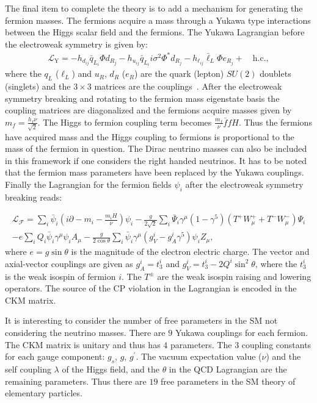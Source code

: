 The final item to complete the theory is to add a mechanism for generating the fermion masses. The fermions acquire a mass through a Yukawa type interactions between the Higgs scalar field and the fermions. The Yukawa Lagrangian before the electroweak symmetry is given by:
\begin{eqnarray} \label{eq:yukawa}
\mathcal{L_{\mathrm{Y}}} = -h_{d_{ij}} \bar{q}_{L_{i}} \Phi d_{R_j}  - h_{u_{ij}} \bar{q}_{L_{i}} i\sigma^{2}\Phi^{*}d_{R_j} - h_{\ell_{ij}} \bar{\ell}_L \Phi e_{R_j} + \quad \mathrm{h.c.}, 
\end{eqnarray}   
where the $q_L$ ($\ell_L$) and $u_R$, $d_R$ ($e_R$) are the quark (lepton) $SU(2)$ doublets (singlets) and the $3\times3$ matrices are the couplings~\cite{Agashe:2014kda}. After the electroweak symmetry breaking and rotating to the fermion mass eigenstate basis the coupling matrices are diagonalized and the fermions acquire masses given by $m_{f} = \frac{h_f \nu}{\sqrt{2}}$. The Higgs to fermion coupling term becomes $\frac{m_{f}}{\nu}\bar{f}fH$. Thus the fermions have acquired mass and the Higgs coupling to fermions is proportional to the mass of the fermion in question. The Dirac neutrino masses can also be included in this framework if one considers the right handed neutrinos. It has to be noted that the fermion mass parameters have been replaced by the Yukawa couplings. Finally the Lagrangian for the fermion fields $\psi_{i}$ after the electroweak symmetry breaking reads:

\begin{eqnarray} \label{eq:lf}
\mathcal{L_F} = \sum_{i} \bar{\psi}_{i} (i\partial - m_{i} - \frac{m_{i}H}{\nu}) \psi_{i} -\frac{g}{2\sqrt{2}}\sum_{i}\bar{\Psi}_i \gamma^{\mu}(1-\gamma^5)(T^{+}W_{\mu}^{+} + T^{-} W_{\mu}^{-})\Psi_{i}  \nonumber \\
-e\sum_{i} Q_i \bar{\psi}_{i} \gamma^{\mu} \psi_i A_{\mu} - \frac{g}{2\cos\theta}\sum_{i}\bar{\psi}_i \gamma^{\mu}(g_{V}^{i}-g_{A}^{i}\gamma^{5})\psi_{i}Z_{\mu}, 
\end{eqnarray}
where $e=g \sin \theta$ is the magnitude of the electron electric charge. The vector and axial-vector couplings are given as $g_{A}^{i}=t^{i}_{3}$ and $g_{V}^{i}=t^{i}_{3}-2Q^{i} \sin^{2} \theta$, where the  $t^{i}_{3}$ is the weak isospin of fermion $i$. The $T^{\pm}$ are the weak isospin raising and lowering operators. The source of the CP violation in the Lagrangian is encoded in the CKM matrix.

It is interesting to consider the number of free parameters in the SM not considering the neutrino masses. There are $9$ Yukawa couplings for each fermion. The CKM matrix is unitary and thus has $4$ parameters. The $3$ coupling constants for each gauge component: $g_s$, $g$, $g^{'}$. The vacuum expectation value ($\nu$) and the self coupling $\lambda$ of the Higgs field, and the $\theta$ in the QCD Lagrangian are the remaining parameters. Thus there are $19$ free parameters in the SM theory of elementary particles. 


